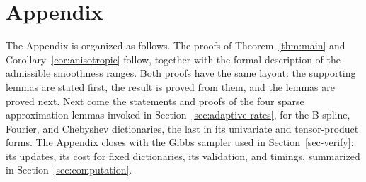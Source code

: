 \section*{Appendix}

The Appendix is organized as follows. The proofs of Theorem~\ref{thm:main} and Corollary~\ref{cor:anisotropic} follow, together with the formal description of the admissible smoothness ranges. Both proofs have the same layout: the supporting lemmas are stated first, the result is proved from them, and the lemmas are proved next. Next come the statements and proofs of the four sparse approximation lemmas invoked in Section~\ref{sec:adaptive-rates}, for the B-spline, Fourier, and Chebyshev dictionaries, the last in its univariate and tensor-product forms. The Appendix closes with the Gibbs sampler used in Section~\ref{sec-verify}: its updates, its cost for fixed dictionaries, its validation, and timings, summarized in Section~\ref{sec:computation}.
